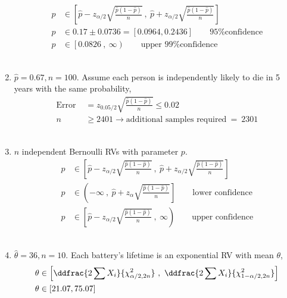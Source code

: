\begin{enumerate}
		\begin{align}
			p &\in \left[ \widehat{p} - z_{\alpha/2}\sqrt{\frac{\widehat{p}(1-\widehat{p})}{n}}\ ,\ \widehat{p} + z_{\alpha/2}\sqrt{\frac{\widehat{p}(1-\widehat{p})}{n}}  \right] \nonumber \\
			p &\in 0.17 \pm 0.0736 = [0.0964, 0.2436] \qquad \text{95\% confidence} \\
			p &\in \left[0.0826\ ,\ \infty \right) \qquad \text{upper 99\% confidence} 
		\end{align}\\
	
	
	\item $ \widehat{p}  = 0.67, n = 100$. Assume each person is independently likely to die in 5 years with the same probability, \\
	
		\begin{align}
			\text{Error } &= z_{0.05/2}\sqrt{\frac{\widehat{p}(1-\widehat{p})}{n}} \leq 0.02 \nonumber \\
			n &\geq 2401 \to \text{additional samples required}\ =\ 2301
		\end{align}\\
	
	
	\item $ n $ independent Bernoulli RVs with parameter $ p $. \\
	
	
		\begin{align}
			p &\in \left[ \widehat{p} - z_{\alpha/2}\sqrt{\frac{\widehat{p}(1-\widehat{p})}{n}}\ ,\ \widehat{p} + z_{\alpha/2}\sqrt{\frac{\widehat{p}(1-\widehat{p})}{n}}  \right] \\
			p &\in \left( -\infty\ ,\ \widehat{p} + z_{\alpha}\sqrt{\frac{\widehat{p}(1-\widehat{p})}{n}}  \right] \qquad \text{lower confidence}\\
			p &\in \left[ \widehat{p} - z_{\alpha/2}\sqrt{\frac{\widehat{p}(1-\widehat{p})}{n}}\ ,\ \infty  \right) \qquad \text{upper confidence}
		\end{align}\\
	
	
	\item $ \widehat{\theta}  = 36, n = 10$. Each battery's lifetime is an exponential RV with mean $ \theta $, \\
	
		\begin{align}
			\theta &\in \left[\ddfrac{2 \sum X_i}{\chi^2_{\alpha/2, 2n}}\ ,\ \ddfrac{2 \sum X_i}{\chi^2_{1 - \alpha/2, 2n}}\right] \nonumber \\
			\theta &\in [21.07, 75.07]
		\end{align}\\
	

\end{enumerate}
